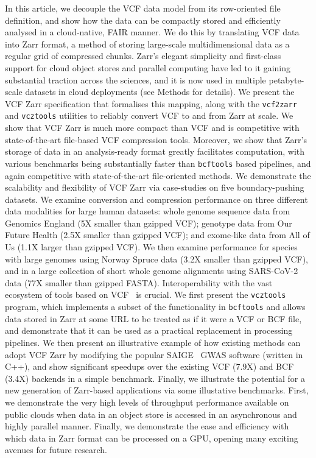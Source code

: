 \documentclass[a4paper,num-refs]{oup-contemporary}
\begin{document}
In this article, we decouple the VCF data model from its row-oriented
file definition, and show how the data can be
compactly stored and efficiently analysed in a cloud-native, FAIR manner.
We do this by translating VCF data into Zarr format,
a method of storing large-scale multidimensional data as a regular
grid of compressed chunks.
Zarr's elegant simplicity and first-class support for
cloud object stores and parallel computing have led to
it gaining substantial traction
across the sciences, and it is now used in multiple petabyte-scale
datasets in cloud deployments (see Methods for details).
We present the VCF Zarr specification that formalises this
mapping, along with the \texttt{vcf2zarr} and \texttt{vcztools} 
utilities to reliably convert VCF to and from Zarr at scale.
We show that VCF Zarr is much more compact than
VCF and is competitive with state-of-the-art
file-based VCF compression tools.
Moreover, we show that Zarr's storage of data in an analysis-ready
format greatly facilitates computation,
with various benchmarks being substantially faster than
\texttt{bcftools} based pipelines, and again competitive
with state-of-the-art file-oriented methods. 
We demonstrate the scalability and flexibility of VCF Zarr
via case-studies on five boundary-pushing datasets.
We examine conversion and compression performance on three different
data modalities for large human datasets: whole genome sequence
data from Genomics England (5X smaller than gzipped VCF);
genotype data from Our Future Health (2.5X smaller than gzipped VCF);
and exome-like data from All of Us (1.1X larger than gzipped VCF). 
We then examine performance 
for species with large genomes using Norway Spruce data (3.2X smaller
than gzipped VCF),
and in a large collection of short whole genome alignments
using SARS-CoV-2 data 
(77X smaller than gzipped FASTA). 
Interoperability with the vast ecosystem of tools
based on VCF~\citep{danecek2021twelve,garrison2022spectrum}
is crucial. 
We first present the \texttt{vcztools} program,
which implements a subset of the functionality in \texttt{bcftools}
and allows data stored in Zarr at some URL to be 
treated as if it were a VCF or BCF file,
and demonstrate that it can be used as a practical replacement 
in processing pipelines.
We then present an illustrative example of how existing
methods can adopt VCF Zarr by modifying the popular 
SAIGE~\cite{zhou2018efficiently, zhou2020scalable} GWAS software
(written in C++), and show significant speedups over the existing 
VCF (7.9X) and BCF (3.4X) backends in a simple benchmark.
Finally, we illustrate the potential 
for a new generation of Zarr-based applications via some illustative
benchmarks. First, we demonstrate the very high levels of throughput 
performance available on public clouds when data in an object 
store is accessed in an asynchronous and highly parallel manner.
Finally, we demonstrate the ease and efficiency with which data
in Zarr format can be processed on a GPU, opening many exciting
avenues for future research.
\end{document}
